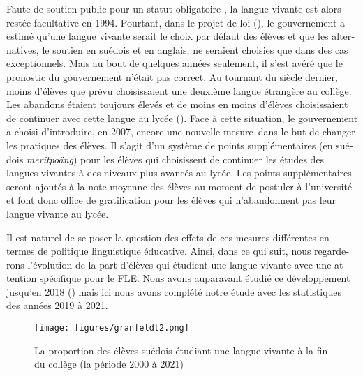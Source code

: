 \documentclass[french, output=paper]{langscibook}
\begin{document}
\begin{otherlanguage}{french}
Faute de soutien public pour un statut obligatoire \citep{Cabau-Lampa2007}, la langue vivante est alors restée facultative en 1994. Pourtant, dans le projet de loi (\citeauthor{Prop1992/93}), le gouvernement a estimé qu'une langue vivante serait le choix par défaut des élèves et que les alternatives, le soutien en suédois et en anglais, ne seraient choisies que dans des cas exceptionnels. Mais au bout de quelques années seulement, il s’est avéré que le pronostic du gouvernement n’était pas correct. Au tournant du siècle dernier, moins d’élèves que prévu choisissaient une deuxième langue étrangère au collège. Les abandons étaient toujours élevés et de moins en moins d’élèves choisissaient de continuer avec cette langue au lycée (\citealt{TholinLindqvist2009}). Face à cette situation, le gouvernement a choisi d’introduire, en 2007, encore une nouvelle mesure~dans le but de changer les pratiques des élèves. Il s’agit d’un système de points supplémentaires (en suédois \textit{meritpoäng}) pour les élèves qui choisissent de continuer les études des langues vivantes à des niveaux plus avancés au lycée. Les points supplémentaires seront ajoutés à la note moyenne des élèves au moment de postuler à l’université et font donc office de gratification pour les élèves qui n’abandonnent pas leur langue vivante au lycée. 

Il est naturel de se poser la question des effets de ces mesures différentes en termes de politique linguistique éducative. Ainsi, dans ce qui suit, nous regarderons l’évolution de la part d’élèves qui étudient une langue vivante avec une attention spécifique pour le FLE. Nous avons auparavant étudié ce développement jusqu’en 2018 (\citealt{GranfeldtÅgren2019, GranfeldtEtAl2021}) mais ici nous avons complété notre étude avec les statistiques des années 2019 à 2021. 

  

 

\begin{figure}
\texttt{[image: figures/granfeldt2.png]}
\caption{La proportion des élèves suédois étudiant une langue vivante à la fin du collège (la période 2000 à 2021)}
\label{fig:granfeldt:2}
\end{figure}


\end{otherlanguage}
\end{document}

